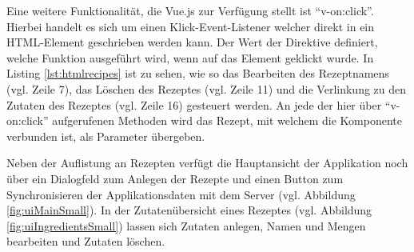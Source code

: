 \documentclass[a4paper, 12pt]{scrreprt}
\begin{document}
Eine weitere Funktionalität, die Vue.js zur Verfügung stellt ist \enquote{v-on:click}. Hierbei handelt es sich um einen Klick-Event-Listener welcher direkt in ein HTML-Element geschrieben werden kann. Der Wert der Direktive definiert, welche Funktion ausgeführt wird, wenn auf das Element geklickt wurde. In Listing \ref{lst:htmlrecipes} ist zu sehen, wie so das Bearbeiten des Rezeptnamens (vgl. Zeile 7), das Löschen des Rezeptes (vgl. Zeile 11) und die Verlinkung zu den Zutaten des Rezeptes (vgl. Zeile 16) gesteuert werden. An jede der hier über \enquote{v-on:click} aufgerufenen Methoden wird das Rezept, mit welchem die Komponente verbunden ist, als Parameter übergeben. 

\begin{minipage}{\linewidth}
	
\end{minipage}

Neben der Auflistung an Rezepten verfügt die Hauptansicht der Applikation noch über ein Dialogfeld zum Anlegen der Rezepte und einen Button zum Synchronisieren der Applikationsdaten mit dem Server (vgl. Abbildung \ref{fig:uiMainSmall}). In der Zutatenübersicht eines Rezeptes (vgl. Abbildung \ref{fig:uiIngredientsSmall}) lassen sich Zutaten anlegen, Namen und Mengen bearbeiten und Zutaten löschen.
\end{document}

